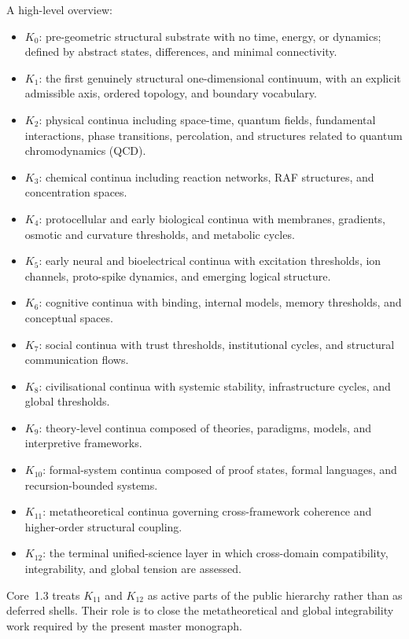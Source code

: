 A high-level overview:

\begin{itemize}
    \item \(K_0\): pre-geometric structural substrate with no time, energy, or dynamics; defined by abstract states, differences, and minimal connectivity.
    \item \(K_1\): the first genuinely structural one-dimensional continuum, with an explicit admissible axis, ordered topology, and boundary vocabulary.
    \item \(K_2\): physical continua including space-time, quantum fields, fundamental interactions, phase transitions, percolation, and structures related to quantum chromodynamics (QCD).
    \item \(K_3\): chemical continua including reaction networks, RAF structures, and concentration spaces.
    \item \(K_4\): protocellular and early biological continua with membranes, gradients, osmotic and curvature thresholds, and metabolic cycles.
    \item \(K_5\): early neural and bioelectrical continua with excitation thresholds, ion channels, proto-spike dynamics, and emerging logical structure.
    \item \(K_6\): cognitive continua with binding, internal models, memory thresholds, and conceptual spaces.
    \item \(K_7\): social continua with trust thresholds, institutional cycles, and structural communication flows.
    \item \(K_8\): civilisational continua with systemic stability, infrastructure cycles, and global thresholds.
    \item \(K_9\): theory-level continua composed of theories, paradigms, models, and interpretive frameworks.
    \item \(K_{10}\): formal-system continua composed of proof states, formal languages, and recursion-bounded systems.
    \item \(K_{11}\): metatheoretical continua governing cross-framework coherence and higher-order structural coupling.
    \item \(K_{12}\): the terminal unified-science layer in which cross-domain compatibility, integrability, and global tension are assessed.
\end{itemize}

Core~1.3 treats \(K_{11}\) and \(K_{12}\) as active parts of the public
hierarchy rather than as deferred shells. Their role is to close the
metatheoretical and global integrability work required by the present master
monograph.

